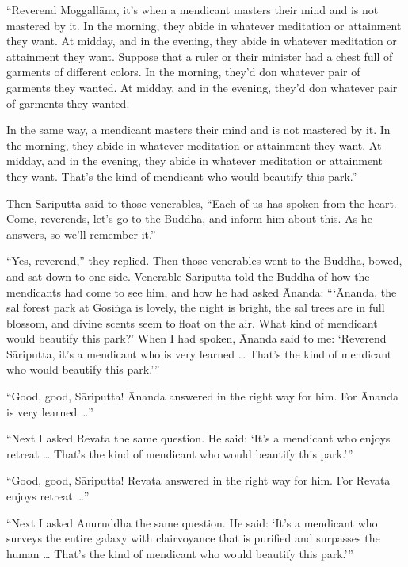 \documentclass[12pt,openany]{book}%
\begin{document}
“Reverend \textsanskrit{Moggallāna}, it’s when a mendicant masters their mind and is not mastered by it. In the morning, they abide in whatever meditation or attainment they want. At midday, and in the evening, they abide in whatever meditation or attainment they want. Suppose that a ruler or their minister had a chest full of garments of different colors. In the morning, they’d don whatever pair of garments they wanted. At midday, and in the evening, they’d don whatever pair of garments they wanted. 

In the same way, a mendicant masters their mind and is not mastered by it. In the morning, they abide in whatever meditation or attainment they want. At midday, and in the evening, they abide in whatever meditation or attainment they want. That’s the kind of mendicant who would beautify this park.” 

Then \textsanskrit{Sāriputta} said to those venerables, “Each of us has spoken from the heart. Come, reverends, let’s go to the Buddha, and inform him about this. As he answers, so we’ll remember it.” 

“Yes, reverend,” they replied. Then those venerables went to the Buddha, bowed, and sat down to one side. Venerable \textsanskrit{Sāriputta} told the Buddha of how the mendicants had come to see him, and how he had asked Ānanda: “‘Ānanda, the sal forest park at \textsanskrit{Gosiṅga} is lovely, the night is bright, the sal trees are in full blossom, and divine scents seem to float on the air. What kind of mendicant would beautify this park?’ When I had spoken, Ānanda said to me: ‘Reverend \textsanskrit{Sāriputta}, it’s a mendicant who is very learned … That’s the kind of mendicant who would beautify this park.’” 

“Good, good, \textsanskrit{Sāriputta}! Ānanda answered in the right way for him. For Ānanda is very learned …” 

“Next I asked Revata the same question. He said: ‘It’s a mendicant who enjoys retreat … That’s the kind of mendicant who would beautify this park.’” 

“Good, good, \textsanskrit{Sāriputta}! Revata answered in the right way for him. For Revata enjoys retreat …” 

“Next I asked Anuruddha the same question. He said: ‘It’s a mendicant who surveys the entire galaxy with clairvoyance that is purified and surpasses the human … That’s the kind of mendicant who would beautify this park.’” 
\end{document}
